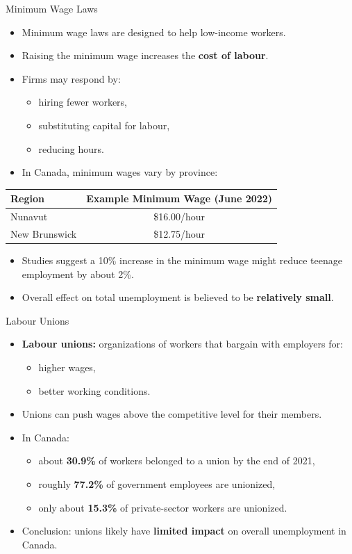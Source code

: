 \documentclass[aspectratio=169]{beamer}
\begin{document}
\begin{frame}{Minimum Wage Laws}
\transfade
\begin{itemize}
  \item Minimum wage laws are designed to help low-income workers.
  \item Raising the minimum wage increases the \textbf{cost of labour}.
  \item Firms may respond by:
  \begin{itemize}
    \item hiring fewer workers,
    \item substituting capital for labour,
    \item reducing hours.
  \end{itemize}
  \item In Canada, minimum wages vary by province:
\end{itemize}
\small
\begin{tabular}{l c}
\toprule
Region & Example Minimum Wage (June 2022) \\
\midrule
Nunavut & \$16.00/hour \\
New Brunswick & \$12.75/hour \\
\bottomrule
\end{tabular}

\vspace{0.4em}
\begin{itemize}
  \item Studies suggest a 10\% increase in the minimum wage might reduce teenage employment by about 2\%.
  \item Overall effect on total unemployment is believed to be \textbf{relatively small}.
\end{itemize}
\end{frame}

\begin{frame}{Labour Unions}
\transfade
\begin{itemize}
  \item \textbf{Labour unions:} organizations of workers that bargain with employers for:
  \begin{itemize}
    \item higher wages,
    \item better working conditions.
  \end{itemize}
  \item Unions can push wages above the competitive level for their members.
  \item In Canada:
  \begin{itemize}
    \item about \textbf{30.9\%} of workers belonged to a union by the end of 2021,
    \item roughly \textbf{77.2\%} of government employees are unionized,
    \item only about \textbf{15.3\%} of private-sector workers are unionized.
  \end{itemize}
  \item Conclusion: unions likely have \textbf{limited impact} on overall unemployment in Canada.
\end{itemize}
\end{frame}
\end{document}
